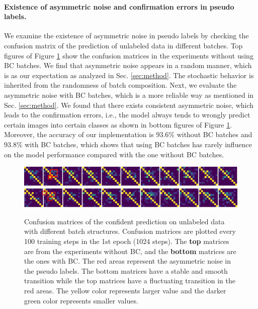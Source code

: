 \paragraph{Existence of asymmetric noise and confirmation errors in pseudo labels.} We examine the existence of asymmetric noise in pseudo labels by checking the confusion matrix of the prediction of unlabeled data in different batches. Top figures of Figure \ref{fig:cfmx} show the confusion matrices in the experiments without using BC batches. We find that asymmetric noise appears in a random manner, which is as our expectation as analyzed in Sec. \ref{sec:method}. The stochastic behavior is inherited from the randomness of batch composition. Next, we evaluate the asymmetric noise with BC batches, which is a more reliable way as mentioned in Sec. \ref{sec:method}. We found that there exists consistent asymmetric noise, which leads to the confirmation errors, i.e., the model always tends to wrongly predict certain images into certain classes as shown in bottom figures of Figure \ref{fig:cfmx}.
Moreover, the accuracy of our implementation is $93.6\%$ without BC batches and $93.8\%$ with BC batches, which shows that using BC batches has rarely influence on the model performance compared with the one without BC batches.

\begin{figure}[h]
\centering
\includegraphics[width=14cm]{fig/uBC.png}\\
\includegraphics[width=14cm]{fig/BC.png}
\caption{Confusion matrices of the confident prediction on unlabeled data with different batch structures.
Confusion matrices are plotted every 100 training steps in the 1st epoch (1024 steps).
The \textbf{top} matrices are from the experiments without BC, and the \textbf{bottom} matrices are the ones with BC. The red areas represent the asymmetric noise in the pseudo labels. The bottom matrices have a stable and smooth transition while the top matrices have a fluctuating transition in the red areas. The yellow color represents larger value and the darker green color represents smaller values.
}\label{fig:cfmx}
\end{figure}

